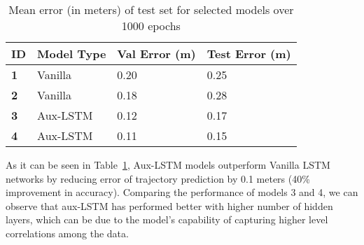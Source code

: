 \begin{table}[!h]

    \caption{Mean error (in meters) of test set for selected models over 1000 epochs}
    \centering
    \small\addtolength{\tabcolsep}{-3pt}
    \begin{tabular}{|l|l|l|l|}
    \hline
       \textbf{ID} & \textbf{Model Type} & \textbf{Val Error (m)} & \textbf{Test Error (m)} \\
       \hline
    
         \textbf{1} & Vanilla & 0.20 & 0.25\\
         \textbf{2} & Vanilla & 0.18 & 0.28 \\
         \textbf{3} & Aux-LSTM & 0.12 & 0.17 \\
         \textbf{4} & Aux-LSTM & 0.11 & 0.15 \\
    \hline
    \end{tabular}
    \label{tab:Ttest}
\end{table}
As it can be seen in Table~\ref{tab:Ttest}, Aux-LSTM models outperform Vanilla LSTM networks by reducing error of trajectory prediction by 0.1 meters (40\% improvement in accuracy). Comparing the performance of models 3 and 4, we can observe that aux-LSTM has performed better with higher number of hidden layers, which can be due to the model's capability of capturing higher level correlations among the data.  